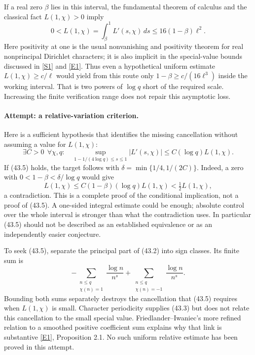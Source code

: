 \documentclass[11pt,a4paper]{article}
\newcommand{\sref}[2]{\hyperlink{source:#1:#2}{[S#2]}}
\newcommand{\eref}[2]{\hyperlink{extra:#1:#2}{[E#2]}}
\numberwithin{equation}{section}
\begin{document}
If a real zero $\beta$ lies in this interval, the fundamental theorem of
calculus and the classical fact $L(1,\chi)>0$ imply
\[
 0<L(1,\chi)=\int_\beta^1 L'(s,\chi)\,ds
       \le16(1-\beta)\ell^2. \tag{43.4}
\]
Here positivity at one is the usual nonvanishing and positivity theorem
for real nonprincipal Dirichlet characters; it is also implicit in the
special-value bounds discussed in \sref{1509}{1} and \eref{1509}{1}.
Thus even a hypothetical uniform estimate
$L(1,\chi)\ge c/\ell$ would yield from this route only
$1-\beta\ge c/(16\ell^3)$ inside the working interval. That is two powers
of $\log q$ short of the required scale. Increasing the finite verification
range does not repair this asymptotic loss.

\paragraph{Attempt: a relative-variation criterion.}
Here is a sufficient hypothesis that identifies the missing cancellation
without assuming a value for $L(1,\chi)$:
\[
 \exists C>0\ \ \forall\chi,q:\quad
 \sup_{1-1/(4\log q)\le s\le1}|L'(s,\chi)|
          \le C(\log q)L(1,\chi). \tag{43.5}
\]
If (43.5) holds, the target follows with
$\delta=\min\{1/4,1/(2C)\}$. Indeed, a zero with
$0<1-\beta<\delta/\log q$ would give
\[
 L(1,\chi)\le C(1-\beta)(\log q)L(1,\chi)
                  <\tfrac12 L(1,\chi),
\]
a contradiction. This is a complete proof of the conditional implication,
not a proof of (43.5). A one-sided integral estimate could be enough;
absolute control over the whole interval is stronger than what the
contradiction uses. In particular (43.5) should not be described as an
established equivalence or as an independently easier conjecture.

To seek (43.5), separate the principal part of (43.2) into sign classes.
Its finite sum is
\[
 -\sum_{\substack{n\le q\\\chi(n)=1}}\frac{\log n}{n^s}
 +\sum_{\substack{n\le q\\\chi(n)=-1}}\frac{\log n}{n^s}.
\]
Bounding both sums separately destroys the cancellation that (43.5)
requires when $L(1,\chi)$ is small. Character periodicity supplies (43.3)
but does not relate this cancellation to the small special value.
Friedlander--Iwaniec's more refined relation to a smoothed positive
coefficient sum explains why that link is substantive
\eref{1509}{1}, Proposition 2.1. No such uniform relative estimate has been
proved in this attempt.
\end{document}
